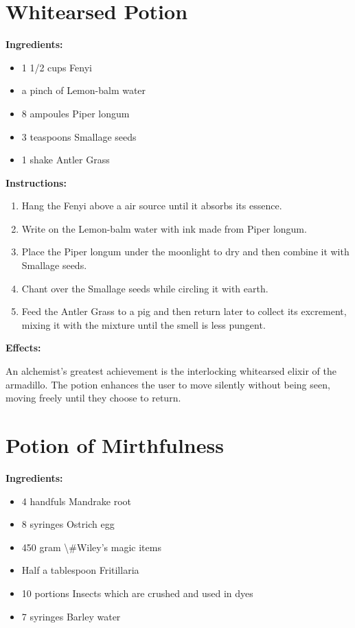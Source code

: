 \documentclass{article}
\begin{document}
\newpage
\section*{Whitearsed Potion}

\textbf{Ingredients:}

\begin{itemize}
  \item 1 1/2 cups Fenyi
  \item a pinch of Lemon-balm water
  \item 8 ampoules Piper longum
  \item 3 teaspoons Smallage seeds
  \item 1 shake Antler Grass
\end{itemize}

\textbf{Instructions:}

\begin{enumerate}
  \item Hang the Fenyi above a air source until it absorbs its essence.
  \item Write on the Lemon-balm water with ink made from Piper longum.
  \item Place the Piper longum under the moonlight to dry and then combine it with Smallage seeds.
  \item Chant over the Smallage seeds while circling it with earth.
  \item Feed the Antler Grass to a pig and then return later to collect its excrement, mixing it with the mixture until the smell is less pungent.
\end{enumerate}

\textbf{Effects:}

An alchemist's greatest achievement is the interlocking whitearsed elixir of the armadillo. The potion enhances the user to move silently without being seen, moving freely until they choose to return.

\newpage
\section*{Potion of Mirthfulness}

\textbf{Ingredients:}

\begin{itemize}
  \item 4 handfuls Mandrake root
  \item 8 syringes Ostrich egg
  \item 450 gram \textbackslash{}#Wiley's magic items
  \item Half a tablespoon Fritillaria
  \item 10 portions Insects which are crushed and used in dyes
  \item 7 syringes Barley water
\end{itemize}
\end{document}
